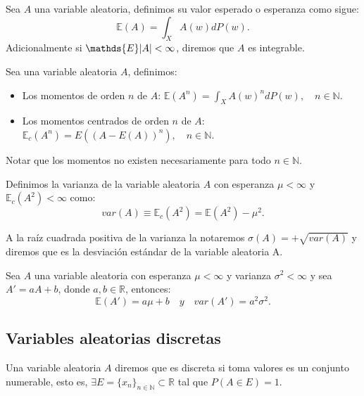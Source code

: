 \documentclass[../proyecto.tex]{memoir}
\begin{document}
\begin{defi}
Sea $A$ una variable aleatoria, definimos su valor esperado o esperanza como sigue:
$$
\mathds{E}(A) = \int_{X}A(w)dP(w).
$$
Adicionalmente si $\mathds{E}\abs{A} < \infty$, diremos que $A$ es integrable.
\end{defi}

\begin{defi}
Sea una variable aleatoria $A$, definimos:
\begin{itemize}
\item Los momentos de orden $n$ de $A$: $\mathds{E}(A^n) = \int_{X}A(w)^{n}dP(w), \quad n \in \mathds{N}$.
\item Los momentos centrados de orden $n$ de $A$: $\mathds{E}_c(A^n) = E( (A-E(A))^n ), \quad n \in \mathds{N}$.
\end{itemize}
\end{defi}

Notar que los momentos no existen necesariamente para todo $n\in \mathds{N}$.

\begin{defi}
Definimos la varianza de la variable aleatoria $A$ con esperanza $\mu < \infty$ y $\mathds{E}_c(A^2) < \infty $ como:$$
var(A) \equiv \mathds{E}_c(A^2) = \mathds{E}(A^2) - \mu^2.
$$
\end{defi}

\begin{defi}
A la raíz cuadrada positiva de la varianza la notaremos $\sigma(A)=+\sqrt{var(A)}$ y diremos que es la desviación estándar de la variable aleatoria A. 
\end{defi}

\begin{prop}
Sea $A$ una variable aleatoria con esperanza $\mu < \infty$ y varianza $\sigma^2 < \infty$ y sea $A'=aA+b$, donde $a,b\in\mathds{R}$, entonces: $$
\mathds{E}(A')=a\mu + b \quad y \quad var(A') = a^2 \sigma^2.
$$

\end{prop}


\subsection{Variables aleatorias discretas}

\begin{defi}
Una variable aleatoria $A$ diremos que es discreta si toma valores es un conjunto numerable, esto es, $\exists E=\{x_n\}_{n \in \mathds{N}} \subset \mathds{R}$ tal que $P(A \in E)=1$. 
\end{defi}
\end{document}
